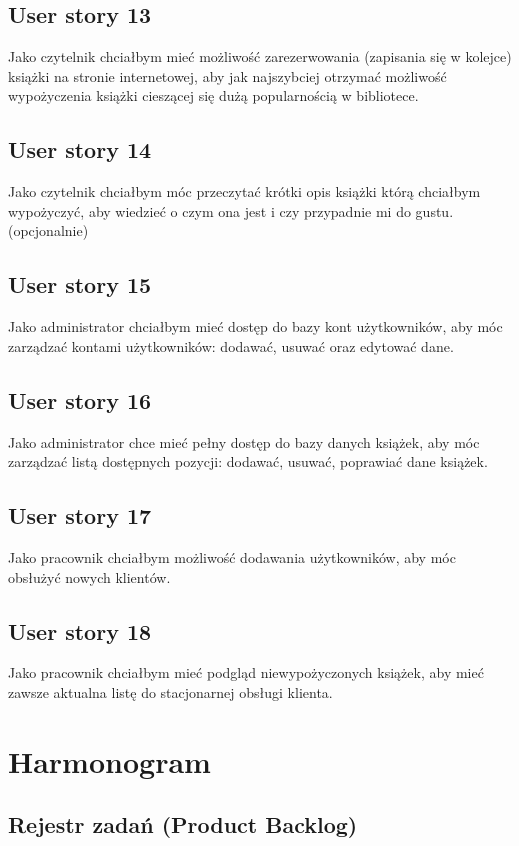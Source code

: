 \documentclass[a4paper]{article}
\begin{document}
\subsection{User story 13}
Jako czytelnik chciałbym mieć możliwość zarezerwowania (zapisania się w kolejce) książki na stronie internetowej, aby jak najszybciej otrzymać możliwość wypożyczenia książki cieszącej się dużą popularnością w bibliotece.

\subsection{User story 14}
Jako czytelnik chciałbym móc przeczytać krótki opis książki którą chciałbym wypożyczyć, aby wiedzieć o czym ona jest i czy przypadnie mi do gustu.(opcjonalnie)

\subsection{User story 15}
Jako administrator chciałbym mieć dostęp do bazy kont użytkowników, aby móc zarządzać kontami użytkowników: dodawać, usuwać oraz edytować dane.

\subsection{User story 16}
Jako administrator chce mieć pełny dostęp do bazy danych książek, aby móc zarządzać listą dostępnych pozycji: dodawać, usuwać, poprawiać dane książek.

\subsection{User story 17}
Jako pracownik chciałbym możliwość dodawania użytkowników, aby móc obsłużyć nowych klientów.

\subsection{User story 18}
Jako pracownik chciałbym mieć podgląd niewypożyczonych książek, aby mieć zawsze aktualna listę do stacjonarnej obsługi klienta.



\section{Harmonogram}

\subsection{Rejestr zadań (Product Backlog)}
\end{document}
